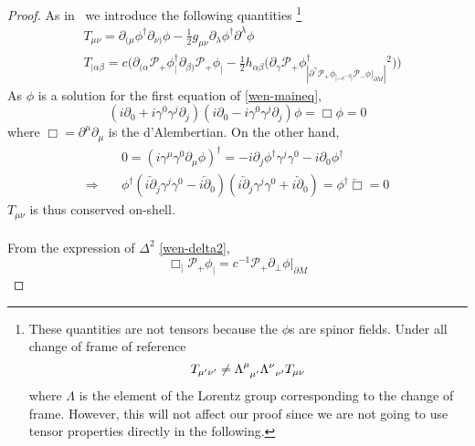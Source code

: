 \begin{proof}
As in~\cite{Zahn2016} we introduce the following quantities
\footnote{
These quantities are not tensors because the $\phi$s are spinor fields. 
Under all change of frame of reference
\begin{equation*}
T_{\mu'\nu'} \neq \Lambda^\mu_{\enskip \mu'}\Lambda^\nu_{\enskip \nu'}T_{\mu \nu} 
\end{equation*}
where $\Lambda$ is the element of the Lorentz group corresponding to the change of frame.
However, 
this will not affect our proof since we are not going to use tensor properties directly in the following.
}
\begin{equation*}
\begin{split}
& T_{\mu\nu} = \partial_{(\mu} \phi^\dagger \partial_{\nu)} \phi - \frac{1}{2}g_{\mu\nu} \partial_\lambda\phi^\dagger\partial^\lambda\phi  \\
& T_{|\alpha\beta} = c\Big( \partial_{(\alpha}\mathcal{P}_+\phi^\dagger_| \partial_{\beta)}\mathcal{P}_+\phi_| - 
\frac{1}{2}h_{\alpha\beta}\big( \partial_\gamma\mathcal{P}_+\phi^\dagger_| \partial^\gamma\mathcal{P}_+\phi_|
 - c^{-2}|\mathcal{P}_- \phi\vert_{\partial M}|^2 \big)\Big) 
\end{split}
\end{equation*}
As $\phi$ is a solution for the first equation of \cref{wen-maineq},
\begin{equation*}
(i\partial_0 + i\gamma^0\gamma^j\partial_j)( i\partial_0 -i\gamma^0\gamma^j\partial_j)\phi  = 
\Box \phi= 0
\end{equation*}
where $\Box = \partial^\mu\partial_\mu$ is the d'Alembertian.
On the other hand, 
\begin{equation*}
\begin{split}
&0 = (i\gamma^\mu\gamma^0\partial_\mu\phi)^\dagger
= - i\partial_j\phi^\dagger\gamma^j\gamma^0 - i\partial_0\phi^\dagger \\
\Rightarrow \quad &
\phi^\dagger(i\overleftarrow{\partial}_j\gamma^j\gamma^0 - i\overleftarrow{\partial}_0)
(i\overleftarrow{\partial}_j\gamma^j\gamma^0 + i\overleftarrow{\partial}_0)
= \phi^\dagger \overleftarrow{\Box} = 0
\end{split}
\end{equation*}
$T_{\mu\nu}$ is thus conserved on-shell. \\\\
From the expression of $\Delta^2$ \cref{wen-delta2}, 
\begin{equation*}
\Box_|\mathcal{P}_+ \phi_| = c^{-1}\mathcal{P}_+\partial_\bot \phi\vert_{\partial M}

\end{equation*}
\end{proof}
